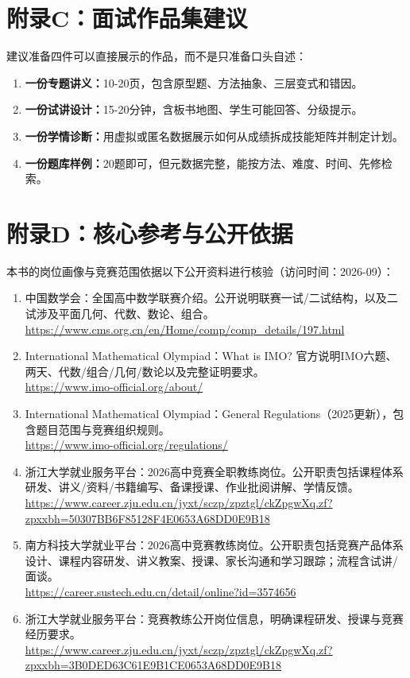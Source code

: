 \documentclass[11pt,openany]{ctexbook}
\begin{document}
\chapter{附录C：面试作品集建议}
建议准备四件可以直接展示的作品，而不是只准备口头自述：
\begin{enumerate}
\item \textbf{一份专题讲义：}10-20页，包含原型题、方法抽象、三层变式和错因。
\item \textbf{一份试讲设计：}15-20分钟，含板书地图、学生可能回答、分级提示。
\item \textbf{一份学情诊断：}用虚拟或匿名数据展示如何从成绩拆成技能矩阵并制定计划。
\item \textbf{一份题库样例：}20题即可，但元数据完整，能按方法、难度、时间、先修检索。
\end{enumerate}

\chapter{附录D：核心参考与公开依据}
本书的岗位画像与竞赛范围依据以下公开资料进行核验（访问时间：2026-09）：
\begin{enumerate}
\item 中国数学会：全国高中数学联赛介绍。公开说明联赛一试/二试结构，以及二试涉及平面几何、代数、数论、组合。\\
\url{https://www.cms.org.cn/en/Home/comp/comp_details/197.html}
\item International Mathematical Olympiad：What is IMO? 官方说明IMO六题、两天、代数/组合/几何/数论以及完整证明要求。\\
\url{https://www.imo-official.org/about/}
\item International Mathematical Olympiad：General Regulations（2025更新），包含题目范围与竞赛组织规则。\\
\url{https://www.imo-official.org/regulations/}
\item 浙江大学就业服务平台：2026高中竞赛全职教练岗位。公开职责包括课程体系研发、讲义/资料/书籍编写、备课授课、作业批阅讲解、学情反馈。\\
\url{https://www.career.zju.edu.cn/jyxt/sczp/zpztgl/ckZpgwXq.zf?zpxxbh=50307BB6F85128F4E0653A68DD0E9B18}
\item 南方科技大学就业平台：2026高中竞赛教练岗位。公开职责包括竞赛产品体系设计、课程内容研发、讲义教案、授课、家长沟通和学习跟踪；流程含试讲/面谈。\\
\url{https://career.sustech.edu.cn/detail/online?id=3574656}
\item 浙江大学就业服务平台：竞赛教练公开岗位信息，明确课程研发、授课与竞赛经历要求。\\
\url{https://www.career.zju.edu.cn/jyxt/sczp/zpztgl/ckZpgwXq.zf?zpxxbh=3B0DED63C61E9B1CE0653A68DD0E9B18}
\end{enumerate}
\end{document}

